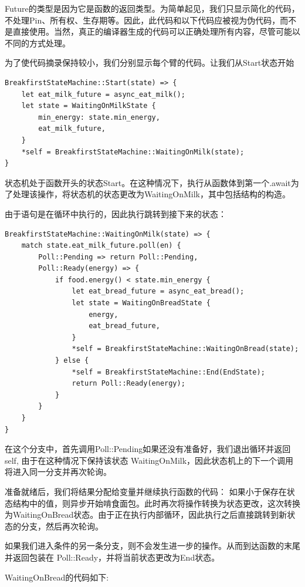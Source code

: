 Future的类型是因为它是函数的返回类型。为简单起见，我们只显示简化的代码，不处理Pin、所有权、生存期等。因此，此代码和以下代码应被视为伪代码，而不是直接使用。当然，真正的编译器生成的代码可以正确处理所有内容，尽管可能以不同的方式处理。


为了使代码摘录保持较小，我们分别显示每个臂的代码。让我们从Start状态开始

\begin{lstlisting}[caption = Start Branch]
BreakfirstStateMachine::Start(state) => {
    let eat_milk_future = async_eat_milk();
    let state = WaitingOnMilkState {
        min_energy: state.min_energy,
        eat_milk_future,
    }
    *self = BreakfirstStateMachine::WaitingOnMilk(state);
}
\end{lstlisting}

状态机处于函数开头的状态Start。在这种情况下，执行从函数体到第一个.await为了处理该操作，将状态机的状态更改为WaitingOnMilk，其中包括结构的构造。


由于语句是在循环中执行的，因此执行跳转到接下来的状态：

\begin{lstlisting}[caption=WaitingOnMilk Branch]
BreakfirstStateMachine::WaitingOnMilk(state) => {
    match state.eat_milk_future.poll(en) {
        Poll::Pending => return Poll::Pending,
        Poll::Ready(energy) => {
            if food.energy() < state.min_energy {
                let eat_bread_future = async_eat_bread();
                let state = WaitingOnBreadState {
                    energy,
                    eat_bread_future,
                }
                *self = BreakfirstStateMachine::WaitingOnBread(state);
            } else {
                *self = BreakfirstStateMachine::End(EndState);
                return Poll::Ready(energy);
            }
        }
    }
}
\end{lstlisting}

在这个分支中，首先调用Poll::Pending如果还没有准备好，我们退出循环并返回self, 由于在这种情况下保持该状态 WaitingOnMilk，因此状态机上的下一个调用将进入同一分支并再次轮询。

准备就绪后，我们将结果分配给变量并继续执行函数的代码： 如果小于保存在状态结构中的值，则异步开始啃食面包。此时再次将操作转换为状态更改，这次转换为WaitingOnBread状态。由于正在执行内部循环，因此执行之后直接跳转到新状态的分支，然后再次轮询。

如果我们进入条件的另一条分支，则不会发生进一步的操作。从而到达函数的末尾并返回包装在 Poll::Ready，并将当前状态更改为End状态。


WaitingOnBread的代码如下:

